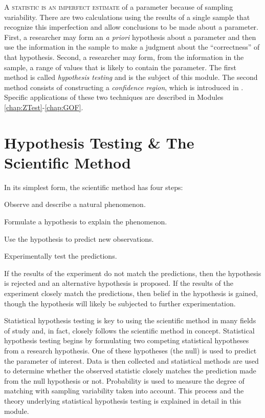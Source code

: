 \documentclass[10pt,openany]{book}\usepackage[]{graphicx}\usepackage[]{color}
\begin{document}
\lettrine{A}{ statistic is an imperfect estimate} of a parameter because of sampling variability. There are two calculations using the results of a single sample that recognize this imperfection and allow conclusions to be made about a parameter. First, a researcher may form an \emph{a priori} hypothesis about a parameter and then use the information in the sample to make a judgment about the ``correctness'' of that hypothesis. Second, a researcher may form, from the information in the sample, a range of values that is likely to contain the parameter. The first method is called \emph{hypothesis testing} and is the subject of this module. The second method consists of constructing a \emph{confidence region}, which is introduced in . Specific applications of these two techniques are described in Modules \ref{chap:ZTest}-\ref{chap:GOF}.


\section{Hypothesis Testing \& The Scientific Method} \label{sect:SciMethod}
In its simplest form, the scientific method has four steps:

\vspace*{-6pt}
\begin{Enumerate}
  \item Observe and describe a natural phenomenon.
  \item Formulate a hypothesis to explain the phenomenon.
  \item Use the hypothesis to predict new observations.
  \item Experimentally test the predictions.
\end{Enumerate}
\vspace*{-6pt}

If the results of the experiment do not match the predictions, then the hypothesis is rejected and an alternative hypothesis is proposed. If the results of the experiment closely match the predictions, then belief in the hypothesis is gained, though the hypothesis will likely be subjected to further experimentation.

Statistical hypothesis testing is key to using the scientific method in many fields of study and, in fact, closely follows the scientific method in concept. Statistical hypothesis testing begins by formulating two competing statistical hypotheses from a research hypothesis. One of these hypotheses (the null) is used to predict the parameter of interest. Data is then collected and statistical methods are used to determine whether the observed statistic closely matches the prediction made from the null hypothesis or not. Probability  is used to measure the degree of matching with sampling variability taken into account. This process and the theory underlying statistical hypothesis testing is explained in detail in this module.
\end{document}
